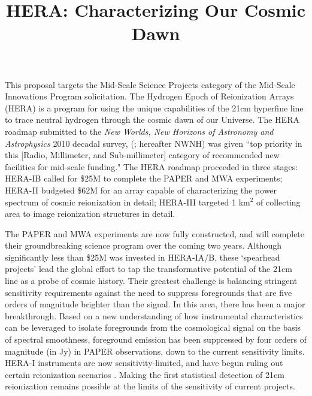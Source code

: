\documentclass[preprint]{aastex}
\begin{document}
\title{HERA: Characterizing Our Cosmic Dawn}

This proposal targets the Mid-Scale Science Projects category of the 
Mid-Scale Innovations Program solicitation.
The Hydrogen Epoch of Reionization Arrays (HERA) is a program for using the
unique capabilities of the 21cm hyperfine line to trace neutral hydrogen
through the cosmic dawn of our Universe.  The HERA roadmap submitted
to the {\it New Worlds, New Horizons of Astronomy and Astrophysics} 2010
decadal survey, (\citealt{astro2010}; hereafter NWNH) was given ``top priority in this [Radio,
Millimeter, and Sub-millimeter] category of recommended new facilities for
mid-scale funding." The HERA roadmap proceeded in three stages: HERA-IB called
for \$25M to complete the PAPER and MWA experiments; HERA-II budgeted \$62M for
an array capable of characterizing the power
spectrum of cosmic reionization in detail; HERA-III targeted 1 km$^2$ of
collecting area to image reionization structures in detail.

The PAPER and MWA experiments are now fully constructed, and will
complete their groundbreaking science program over the coming two years.
Although significantly less than \$25M was invested in HERA-IA/B, these
`spearhead projects' lead the global effort to tap the transformative
potential of the 21cm line as a probe of cosmic history.
Their greatest challenge is balancing stringent sensitivity requirements 
against the need to suppress
foregrounds that are five orders of magnitude brighter than the signal.   In
this area, there has been a major breakthrough.  Based on a new understanding
of how instrumental characteristics can be leveraged to isolate foregrounds
from the cosmological signal on the basis of spectral smoothness,
foreground emission has been suppressed by four orders of magnitude (in Jy) in PAPER
observations, down to the current sensitivity limits.
HERA-I instruments
are now sensitivity-limited, and have begun ruling out certain reionization scenarios
\citep{parsons_et_al2013}. Making the first statistical detection of 21cm
reionization remains possible at the limits of the sensitivity of current
projects.
\end{document}

